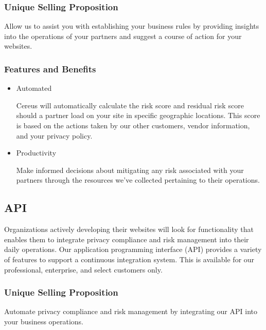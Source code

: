 \subsubsection*{Unique Selling Proposition}

Allow us to assist you with establishing your business rules by providing insights into the operations of your partners and suggest a course of action for your websites.

\subsubsection*{Features and Benefits}

\begin{itemize}

\item Automated

Cereus will automatically calculate the risk score and residual risk score should a partner load on your site in specific geographic locations. This score is based on the actions taken by our other customers, vendor information, and your privacy policy.

\item Productivity

Make informed decisions about mitigating any risk associated with your partners through the resources we've collected pertaining to their operations.

\end{itemize}


\subsection{API}

Organizations actively developing their websites will look for functionality that enables them to integrate privacy compliance and risk management into their daily operations. Our application programming interface (API) provides a variety of features to support a continuous integration system. This is available for our professional, enterprise, and select customers only.

\subsubsection*{Unique Selling Proposition}

Automate privacy compliance and risk management by integrating our API into your business operations.

